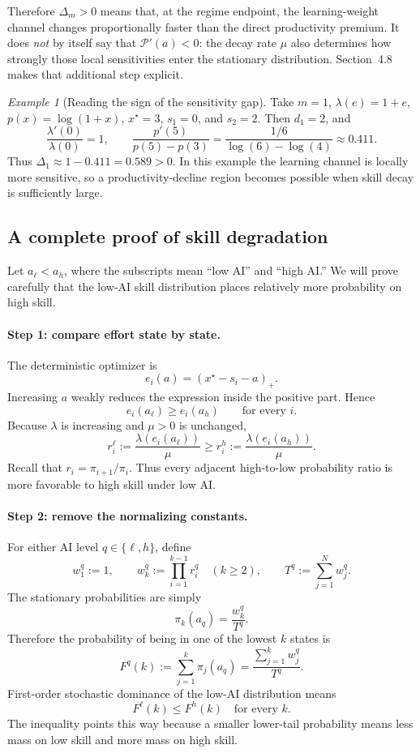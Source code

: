 \documentclass[11pt]{article}
\theoremstyle{tutorial}
\theoremstyle{remark}
\newtheorem{example}[theorem]{Example}
\newcommand{\1}{\mathbb{I}}
\newcommand{\pos}[1]{\left(#1\right)_{+}}
\newcommand{\calP}{\mathcal{P}}
\begin{document}
Therefore $\Delta_m>0$ means that, at the regime endpoint, the learning-weight channel changes
proportionally faster than the direct productivity premium.  It does \emph{not} by itself say that
$\calP'(a)<0$: the decay rate $\mu$ also determines how strongly those local sensitivities enter the
stationary distribution.  Section~4.8 makes that additional step explicit.

\begin{example}[Reading the sign of the sensitivity gap]
Take $m=1$, $\lambda(e)=1+e$, $p(x)=\log(1+x)$, $x^\star=3$, $s_1=0$, and $s_2=2$.
Then $d_1=2$, and
\[
\frac{\lambda'(0)}{\lambda(0)}=1,
\qquad
\frac{p'(5)}{p(5)-p(3)}
=\frac{1/6}{\log(6)-\log(4)}
\approx0.411.
\]
Thus $\Delta_1\approx1-0.411=0.589>0$.  In this example the learning channel is locally more sensitive,
so a productivity-decline region becomes possible when skill decay is sufficiently large.
\end{example}

\subsection{A complete proof of skill degradation}

Let $a_\ell<a_h$, where the subscripts mean ``low AI'' and ``high AI.''  We will prove carefully that
the low-AI skill distribution places relatively more probability on high skill.

\paragraph{Step 1: compare effort state by state.}
The deterministic optimizer is
\[
e_i(a)=\pos{x^\star-s_i-a}.
\]
Increasing $a$ weakly reduces the expression inside the positive part.  Hence
\[
  e_i(a_\ell)\ge e_i(a_h)
  \qquad\text{for every }i.
\]
Because $\lambda$ is increasing and $\mu>0$ is unchanged,
\begin{equation}
  r_i^\ell:=\frac{\lambda(e_i(a_\ell))}{\mu}
  \ge
  r_i^h:=\frac{\lambda(e_i(a_h))}{\mu}.
  \label{eq:ratio-order}
\end{equation}
Recall that $r_i=\pi_{i+1}/\pi_i$.  Thus every adjacent high-to-low probability ratio is more favorable
to high skill under low AI.

\paragraph{Step 2: remove the normalizing constants.}
For either AI level $q\in\{\ell,h\}$, define
\[
  w_1^q:=1,
  \qquad
  w_k^q:=\prod_{i=1}^{k-1}r_i^q\quad(k\ge2),
  \qquad
  T^q:=\sum_{j=1}^N w_j^q.
\]
The stationary probabilities are simply
\[
  \pi_k(a_q)=\frac{w_k^q}{T^q}.
\]
Therefore the probability of being in one of the lowest $k$ states is
\[
  F^q(k):=\sum_{j=1}^k\pi_j(a_q)
  =\frac{\sum_{j=1}^k w_j^q}{T^q}.
\]
First-order stochastic dominance of the low-AI distribution means
\[
  F^\ell(k)\le F^h(k)
  \quad\text{for every }k.
\]
The inequality points this way because a smaller lower-tail probability means less mass on low skill and
more mass on high skill.
\end{document}
